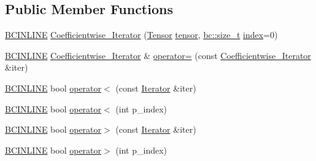 \subsection*{Public Member Functions}
\begin{DoxyCompactItemize}
\item 
\hyperlink{common_8h_a6699e8b0449da5c0fafb878e59c1d4b1}{B\+C\+I\+N\+L\+I\+NE} \hyperlink{structbc_1_1tensors_1_1iterators_1_1Coefficientwise__Iterator_ab65b21459892c1371d3b48c822d4d4f2}{Coefficientwise\+\_\+\+Iterator} (\hyperlink{namespacebc_a659391e47ab612be3ba6c18cf9c89159}{Tensor} \hyperlink{structbc_1_1tensors_1_1iterators_1_1Coefficientwise__Iterator_a57cc6a9c7df0597c90d03309e367cbd2}{tensor}, \hyperlink{namespacebc_aaf8e3fbf99b04b1b57c4f80c6f55d3c5}{bc\+::size\+\_\+t} \hyperlink{structbc_1_1tensors_1_1iterators_1_1Coefficientwise__Iterator_a746b74f8681813da3829e96e0e9b8273}{index}=0)
\item 
\hyperlink{common_8h_a6699e8b0449da5c0fafb878e59c1d4b1}{B\+C\+I\+N\+L\+I\+NE} \hyperlink{structbc_1_1tensors_1_1iterators_1_1Coefficientwise__Iterator}{Coefficientwise\+\_\+\+Iterator} \& \hyperlink{structbc_1_1tensors_1_1iterators_1_1Coefficientwise__Iterator_a81e6dd1d06f313dff3889c290f2ba6f9}{operator=} (const \hyperlink{structbc_1_1tensors_1_1iterators_1_1Coefficientwise__Iterator}{Coefficientwise\+\_\+\+Iterator} \&iter)
\item 
\hyperlink{common_8h_a6699e8b0449da5c0fafb878e59c1d4b1}{B\+C\+I\+N\+L\+I\+NE} bool \hyperlink{structbc_1_1tensors_1_1iterators_1_1Coefficientwise__Iterator_a5ae9fb82012fb8cb602b6554b943ce6d}{operator$<$} (const \hyperlink{structbc_1_1tensors_1_1iterators_1_1Coefficientwise__Iterator_a313f76f47e60a806035279a36a84f835}{Iterator} \&iter)
\item 
\hyperlink{common_8h_a6699e8b0449da5c0fafb878e59c1d4b1}{B\+C\+I\+N\+L\+I\+NE} bool \hyperlink{structbc_1_1tensors_1_1iterators_1_1Coefficientwise__Iterator_a1096597a2e6d99b6cb7b3a85caf15e5b}{operator$<$} (int p\+\_\+index)
\item 
\hyperlink{common_8h_a6699e8b0449da5c0fafb878e59c1d4b1}{B\+C\+I\+N\+L\+I\+NE} bool \hyperlink{structbc_1_1tensors_1_1iterators_1_1Coefficientwise__Iterator_abc7a6543da031f9748a774966557ae0d}{operator$>$} (const \hyperlink{structbc_1_1tensors_1_1iterators_1_1Coefficientwise__Iterator_a313f76f47e60a806035279a36a84f835}{Iterator} \&iter)
\item 
\hyperlink{common_8h_a6699e8b0449da5c0fafb878e59c1d4b1}{B\+C\+I\+N\+L\+I\+NE} bool \hyperlink{structbc_1_1tensors_1_1iterators_1_1Coefficientwise__Iterator_a22b4586524af2b25fae962b9e3c26e72}{operator$>$} (int p\+\_\+index)

\end{DoxyCompactItemize}
